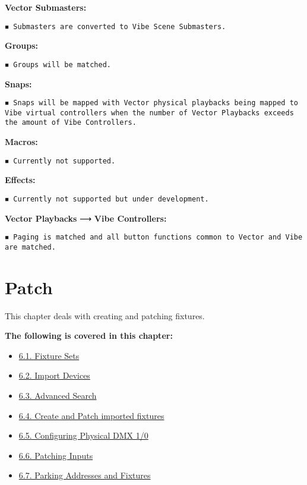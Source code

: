 \documentclass[
]{article}
\providecommand{\tightlist}{%
  \setlength{\itemsep}{0pt}\setlength{\parskip}{0pt}}
\begin{document}
\textbf{Vector Submasters:}

\begin{verbatim}
◾ Submasters are converted to Vibe Scene Submasters.
\end{verbatim}

\textbf{Groups:}

\begin{verbatim}
◾ Groups will be matched.
\end{verbatim}

\textbf{Snaps:}

\begin{verbatim}
◾ Snaps will be mapped with Vector physical playbacks being mapped to Vibe virtual controllers when the number of Vector Playbacks exceeds the amount of Vibe Controllers.
\end{verbatim}

\textbf{Macros:}

\begin{verbatim}
◾ Currently not supported.
\end{verbatim}

\textbf{Effects:}

\begin{verbatim}
◾ Currently not supported but under development.
\end{verbatim}

\textbf{Vector Playbacks} ⟶ \textbf{Vibe Controllers:}

\begin{verbatim}
◾ Paging is matched and all button functions common to Vector and Vibe are matched.
\end{verbatim}

\hypertarget{patch}{%
\section{Patch}\label{patch}}

This chapter deals with creating and patching fixtures.

\textbf{The following is covered in this chapter:}

\begin{itemize}
\tightlist
\item
  \href{https://vibemanual.compulite.com/patch.html\#fixture-sets}{6.1. Fixture Sets}
\item
  \href{https://vibemanual.compulite.com/patch.html\#import-devices}{6.2. Import Devices}
\item
  \href{https://vibemanual.compulite.com/patch.html\#advanced-search}{6.3. Advanced Search}
\item
  \href{https://vibemanual.compulite.com/patch.html\#create-and-patch-imported-fixtures}{6.4. Create and Patch imported fixtures}
\item
  \href{https://vibemanual.compulite.com/patch.html\#configuring-physical-dmx-10}{6.5. Configuring Physical DMX 1/0}
\item
  \href{https://vibemanual.compulite.com/patch.html\#patching-inputs}{6.6. Patching Inputs}
\item
  \href{https://vibemanual.compulite.com/patch.html\#parking-addresses-and-fixtures}{6.7. Parking Addresses and Fixtures}
\end{itemize}
\end{document}
